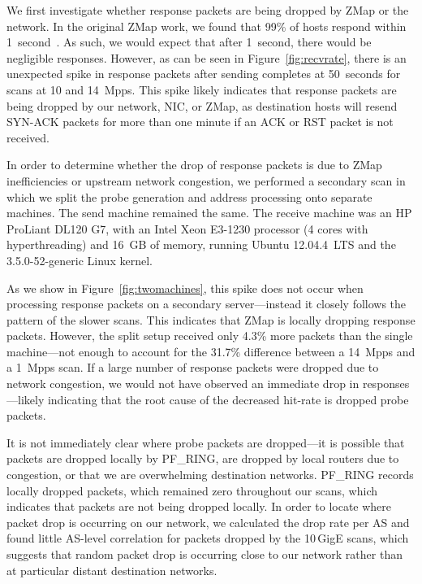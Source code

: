 We first investigate whether response packets are being dropped by ZMap or
the network. In the original ZMap work, we found that 99\% of hosts respond
within 1~second~\cite{zmap}. As such, we would expect that after 1~second,
there would be negligible responses. However, as can be seen in
Figure~\ref{fig:recvrate}, there is an unexpected spike in response packets
after sending completes at 50~seconds for scans at 10 and 14~Mpps. This spike
likely indicates that response packets are being dropped by our network, NIC,
or ZMap, as destination hosts will resend SYN-ACK packets for more than one
minute if an ACK or RST packet is not received.

In order to determine whether the drop of response packets is due to ZMap
inefficiencies or upstream network congestion, we performed a secondary scan
in which we split the probe generation and address processing onto separate
machines. The send machine remained the same. The receive machine was an HP
ProLiant DL120 G7, with an Intel Xeon E3-1230 processor (4 cores with
hyperthreading) and 16~GB of memory, running Ubuntu 12.04.4~LTS and the
3.5.0-52-generic Linux kernel.

As we show in Figure~\ref{fig:twomachines}, this spike does not occur when
processing response packets on a secondary server---instead it closely
follows the pattern of the slower scans. This indicates that ZMap is locally
dropping response packets. However, the split setup received only 4.3\% more
packets than the single machine---not enough to account for the 31.7\%
difference between a 14~Mpps and a 1~Mpps scan. If a large number of response
packets were dropped due to network congestion, we would not have observed an
immediate drop in responses---likely indicating that the root cause of the
decreased hit-rate is dropped probe packets.

It is not immediately clear where probe packets are dropped---it is possible
that packets are dropped locally by PF\_RING, are dropped by local routers
due to congestion, or that we are overwhelming destination networks. PF\_RING
records locally dropped packets, which remained zero throughout our scans,
which indicates that packets are not being dropped locally. In order to
locate where packet drop is occurring on our network, we calculated the drop
rate per AS and found little AS-level correlation for packets dropped by the
10\,GigE scans, which suggests that random packet drop is occurring close to
our network rather than at particular distant destination networks.

